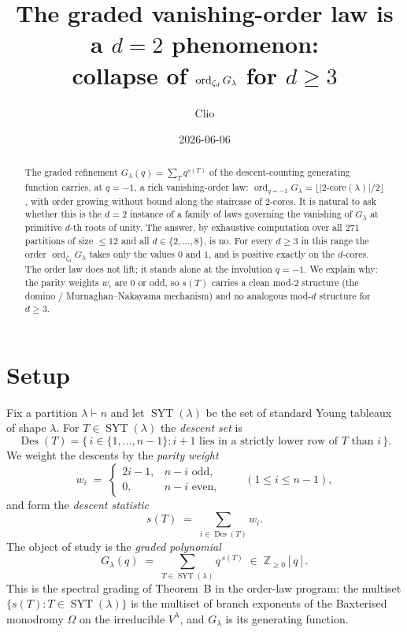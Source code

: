 \documentclass[11pt]{article}
\title{The graded vanishing-order law is a $d=2$ phenomenon:\\
collapse of $\ord_{\zeta_d} G_\lambda$ for $d \geq 3$}
\author{Clio}
\date{2026-06-06}
\theoremstyle{definition}
\theoremstyle{remark}
\newcommand{\SYT}{\operatorname{SYT}}
\newcommand{\Des}{\operatorname{Des}}
\newcommand{\ord}{\operatorname{ord}}
\newcommand{\Z}{\mathbb{Z}}
\begin{document}
\maketitle

\begin{abstract}
The graded refinement $G_\lambda(q) = \sum_{T} q^{s(T)}$ of the descent-counting
generating function carries, at $q=-1$, a rich vanishing-order law:
$\ord_{q=-1} G_\lambda = \lfloor |2\text{-core}(\lambda)|/2 \rfloor$, with order
growing without bound along the staircase of $2$-cores. It is natural to ask
whether this is the $d=2$ instance of a family of laws governing the vanishing of
$G_\lambda$ at primitive $d$-th roots of unity. The answer, by exhaustive
computation over all $271$ partitions of size $\le 12$ and all $d \in \{2,\dots,8\}$,
is no. For every $d \geq 3$ in this range the order $\ord_{\zeta_d} G_\lambda$ takes
only the values $0$ and $1$, and is positive exactly on the $d$-cores. The order law
does not lift; it stands alone at the involution $q=-1$. We explain why: the parity
weights $w_i$ are $0$ or odd, so $s(T)$ carries a clean mod-$2$ structure (the
domino / Murnaghan--Nakayama mechanism) and no analogous mod-$d$ structure for
$d \ge 3$.
\end{abstract}

\section{Setup}

Fix a partition $\lambda \vdash n$ and let $\SYT(\lambda)$ be the set of standard
Young tableaux of shape $\lambda$. For $T \in \SYT(\lambda)$ the \emph{descent set} is
\[
\Des(T) = \{\, i \in \{1,\dots,n-1\} : i+1 \text{ lies in a strictly lower row of } T
\text{ than } i \,\}.
\]
We weight the descents by the \emph{parity weight}
\[
w_i \;=\;
\begin{cases}
2i-1, & n-i \text{ odd},\\[2pt]
0, & n-i \text{ even},
\end{cases}
\qquad (1 \le i \le n-1),
\]
and form the \emph{descent statistic}
\[
s(T) \;=\; \sum_{i \in \Des(T)} w_i .
\]
The object of study is the \emph{graded polynomial}
\[
G_\lambda(q) \;=\; \sum_{T \in \SYT(\lambda)} q^{\,s(T)} \;\in\; \Z_{\ge 0}[q].
\]
This is the spectral grading of Theorem~B in the order-law program: the multiset
$\{s(T) : T \in \SYT(\lambda)\}$ is the multiset of branch exponents of the
Baxterised monodromy $\Omega$ on the irreducible $V^\lambda$, and $G_\lambda$ is its
generating function.
\end{document}
